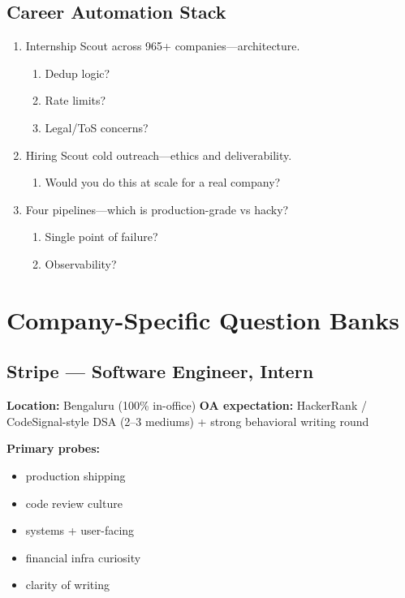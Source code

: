 \documentclass[9pt,a4paper]{article}
\begin{document}
\subsection{Career Automation Stack}
\begin{enumerate}[label=\textbf{Q\arabic*:}, leftmargin=*]
  \item Internship Scout across 965+ companies---architecture.
  \begin{enumerate}[label=\textit{FU\arabic*:}, leftmargin=2em]
    \item Dedup logic?
    \item Rate limits?
    \item Legal/ToS concerns?
  \end{enumerate}
  \item Hiring Scout cold outreach---ethics and deliverability.
  \begin{enumerate}[label=\textit{FU\arabic*:}, leftmargin=2em]
    \item Would you do this at scale for a real company?
  \end{enumerate}
  \item Four pipelines---which is production-grade vs hacky?
  \begin{enumerate}[label=\textit{FU\arabic*:}, leftmargin=2em]
    \item Single point of failure?
    \item Observability?
  \end{enumerate}
\end{enumerate}
\newpage
\section{Company-Specific Question Banks}
\subsection{Stripe --- Software Engineer, Intern}
\textbf{Location:} Bengaluru (100\% in-office) \quad \textbf{OA expectation:} HackerRank / CodeSignal-style DSA (2--3 mediums) + strong behavioral writing round

\textbf{Primary probes:}
\begin{itemize}
  \item production shipping
  \item code review culture
  \item systems + user-facing
  \item financial infra curiosity
  \item clarity of writing
\end{itemize}
\end{document}
